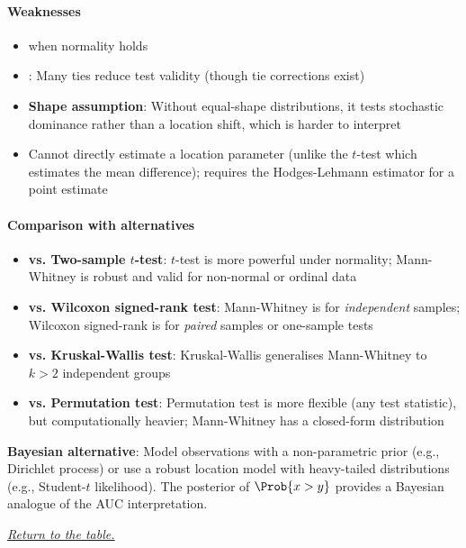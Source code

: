\paragraph{Weaknesses}
\begin{itemize}
    \item {} when normality holds
    \item {}: Many ties reduce test validity (though tie corrections exist)
    \item \textbf{Shape assumption}: Without equal-shape distributions, it tests stochastic
        dominance rather than a location shift, which is harder to interpret
    \item Cannot directly estimate a location parameter (unlike the $t$-test which estimates
        the mean difference); requires the Hodges-Lehmann estimator for a point estimate
\end{itemize}

\paragraph{Comparison with alternatives}
\begin{itemize}
    \item \textbf{vs. Two-sample $t$-test}: $t$-test is more powerful under normality;
        Mann-Whitney is robust and valid for non-normal or ordinal data
    \item \textbf{vs. Wilcoxon signed-rank test}: Mann-Whitney is for \emph{independent}
        samples; Wilcoxon signed-rank is for \emph{paired} samples or one-sample tests
    \item \textbf{vs. Kruskal-Wallis test}: Kruskal-Wallis generalises Mann-Whitney to
        $k > 2$ independent groups
    \item \textbf{vs. Permutation test}: Permutation test is more flexible (any test
        statistic), but computationally heavier; Mann-Whitney has a closed-form distribution
\end{itemize}

\textbf{Bayesian alternative}: Model observations with a non-parametric prior (e.g.,
Dirichlet process) or use a robust location model with heavy-tailed distributions (e.g.,
Student-$t$ likelihood). The posterior of $\Prob{x > y}$ provides a Bayesian analogue
of the AUC interpretation.

\textit{\hyperref[statistical_method_table]{Return to the table.}}

